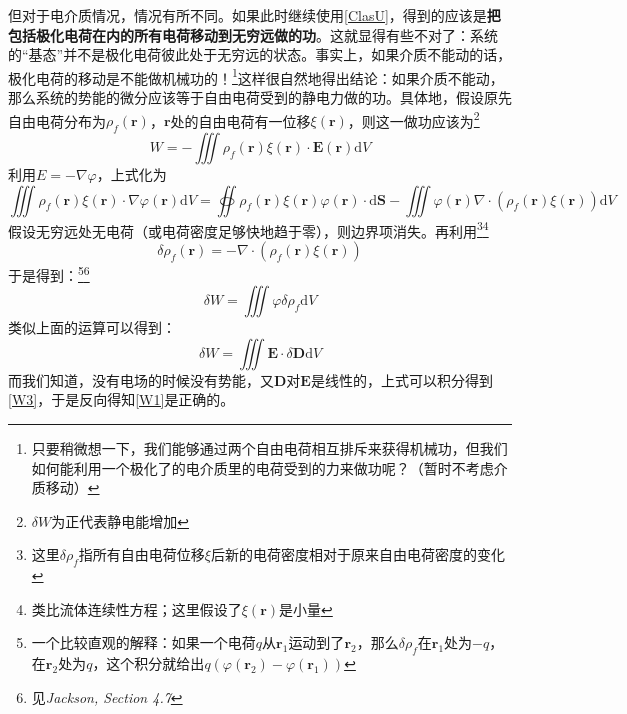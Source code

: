 \documentclass{ctexart}
\begin{document}
	但对于电介质情况，情况有所不同。如果此时继续使用\eqref{ClasU}，得到的应该是\textbf{把包括极化电荷在内的所有电荷移动到无穷远做的功}。这就显得有些不对了：系统的“基态”并不是极化电荷彼此处于无穷远的状态。事实上，如果介质不能动的话，极化电荷的移动是不能做机械功的！\footnote{只要稍微想一下，我们能够通过两个自由电荷相互排斥来获得机械功，但我们如何能利用一个极化了的电介质里的电荷受到的力来做功呢？（暂时不考虑介质移动）}这样很自然地得出结论：如果介质不能动，那么系统的势能的微分应该等于自由电荷受到的静电力做的功。具体地，假设原先自由电荷分布为$\rho_f(\mathbf r)$，$\mathbf r$处的自由电荷有一位移$\xi(\mathbf r)$，则这一做功应该为\footnote{$\delta W$为正代表静电能增加}
	\begin{equation}
	W=-\iiint \rho_f(\mathbf r)\xi(\mathbf r)\cdot \mathbf E(\mathbf r)\mathrm dV
	\end{equation}
	利用$E=-\nabla\varphi$，上式化为
	\begin{equation}
	\iiint \rho_f(\mathbf r)\xi(\mathbf r)\cdot \nabla\varphi(\mathbf r)\mathrm dV=\oiint \rho_f(\mathbf r)\xi(\mathbf r)\varphi(\mathbf r)\cdot\mathrm d\mathbf S-\iiint \varphi(\mathbf r)\nabla\cdot\left(\rho_f(\mathbf r)\xi(\mathbf r)\right)\mathrm dV
	\end{equation}
	假设无穷远处无电荷（或电荷密度足够快地趋于零），则边界项消失。再利用\footnote{这里$\delta\rho_f$指所有自由电荷位移$\xi$后新的电荷密度相对于原来自由电荷密度的变化}\footnote{类比流体连续性方程；这里假设了$\xi(\mathbf r)$是小量}
	\begin{equation}
	\delta\rho_f(\mathbf r)=-\nabla\cdot\left(\rho_f(\mathbf r)\xi(\mathbf r)\right)
	\end{equation}
	于是得到：\footnote{一个比较直观的解释：如果一个电荷$q$从$\mathbf r_1$运动到了$\mathbf r_2$，那么$\delta\rho_f$在$\mathbf r_1$处为$-q$，在$\mathbf r_2$处为$q$，这个积分就给出$q(\varphi(\mathbf r_2)-\varphi(\mathbf r_1))$}\footnote{见\textit{Jackson, Section 4.7}}
	\begin{equation}
	\delta W=\iiint \varphi\delta\rho_f\mathrm dV
	\end{equation}
	类似上面的运算可以得到：
	\begin{equation}
	\delta W=\iiint \mathbf E\cdot\delta\mathbf D\mathrm dV
	\end{equation}
	而我们知道，没有电场的时候没有势能，又$\mathbf D$对$\mathbf E$是线性的，上式可以积分得到\eqref{W3}，于是反向得知\eqref{W1}是正确的。
	
\end{document}
